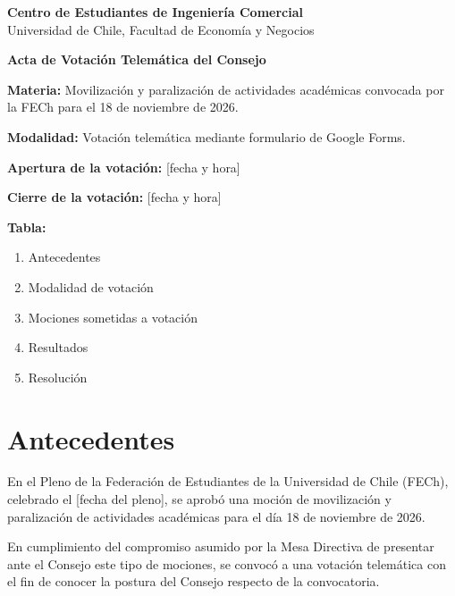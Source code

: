 \documentclass[12pt,letterpaper]{article}
\newif\ifrevision
\newcommand{\dato}[1]{\ifrevision\textcolor[HTML]{C0392B}{#1}\else#1\fi}
\begin{document}
\begin{center}
  {\Large\bfseries Centro de Estudiantes de Ingeniería Comercial}\\
  Universidad de Chile, Facultad de Economía y Negocios

  \vspace{1.2em}
  \textbf{Acta de Votación Telemática del Consejo}
\end{center}

\vspace{0.8em}

\textbf{Materia:} Movilización y paralización de actividades académicas convocada por la FECh para el 18 de noviembre de 2026.

\textbf{Modalidad:} Votación telemática mediante formulario de Google Forms.

\textbf{Apertura de la votación:} \dato{[fecha y hora]}

\textbf{Cierre de la votación:} \dato{[fecha y hora]}

\vspace{1em}

\textbf{Tabla:}

\begin{enumerate}[itemsep=6pt]
  \item Antecedentes
  \item Modalidad de votación
  \item Mociones sometidas a votación
  \item Resultados
  \item Resolución
\end{enumerate}

\section{Antecedentes}

En el Pleno de la Federación de Estudiantes de la Universidad de Chile (FECh), celebrado el \dato{[fecha del pleno]}, se aprobó una moción de movilización y paralización de actividades académicas para el día 18 de noviembre de 2026.

En cumplimiento del compromiso asumido por la Mesa Directiva de presentar ante el Consejo este tipo de mociones, se convocó a una votación telemática con el fin de conocer la postura del Consejo respecto de la convocatoria.
\end{document}

